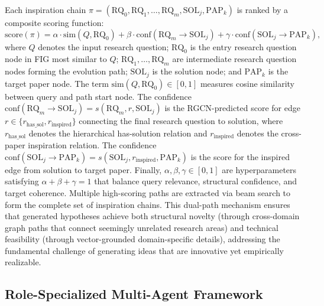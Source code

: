 \documentclass[runningheads]{llncs}
\begin{document}
Each inspiration chain $\pi = (\text{RQ}_0, \text{RQ}_1, \ldots, \text{RQ}_m, \text{SOL}_j, \text{PAP}_k)$ is ranked by a composite scoring function:
\begin{equation}
    \text{score}(\pi) = \alpha \cdot \text{sim}(Q, \text{RQ}_0) + \beta \cdot \text{conf}(\text{RQ}_m \rightarrow \text{SOL}_j) + \gamma \cdot \text{conf}(\text{SOL}_j \rightarrow \text{PAP}_k),
    \label{eq:score}
\end{equation}
where $Q$ denotes the input research question; $\text{RQ}_0$ is the entry research question node in FIG most similar to $Q$; $\text{RQ}_1, \ldots, \text{RQ}_m$ are intermediate research question nodes forming the evolution path; $\text{SOL}_j$ is the solution node; and $\text{PAP}_k$ is the target paper node. The term $\text{sim}(Q, \text{RQ}_0) \in [0, 1]$ measures cosine similarity between query and path start node. The confidence $\text{conf}(\text{RQ}_m \rightarrow \text{SOL}_j) = s(\text{RQ}_m, r, \text{SOL}_j)$ is the RGCN-predicted score for edge $r \in \{r_{\text{has\_sol}}, r_{\text{inspired}}\}$ connecting the final research question to solution, where $r_{\text{has\_sol}}$ denotes the hierarchical has-solution relation and $r_{\text{inspired}}$ denotes the cross-paper inspiration relation. The confidence $\text{conf}(\text{SOL}_j \rightarrow \text{PAP}_k) = s(\text{SOL}_j, r_{\text{inspired}}, \text{PAP}_k)$ is the score for the inspired edge from solution to target paper. Finally, $\alpha, \beta, \gamma \in [0, 1]$ are hyperparameters satisfying $\alpha + \beta + \gamma = 1$ that balance query relevance, structural confidence, and target coherence. Multiple high-scoring paths are extracted via beam search to form the complete set of inspiration chains. This dual-path mechanism ensures that generated hypotheses achieve both structural novelty (through cross-domain graph paths that connect seemingly unrelated research areas) and technical feasibility (through vector-grounded domain-specific details), addressing the fundamental challenge of generating ideas that are innovative yet empirically realizable.

\subsection{Role-Specialized Multi-Agent Framework}
\label{sec:workflow}
\end{document}
